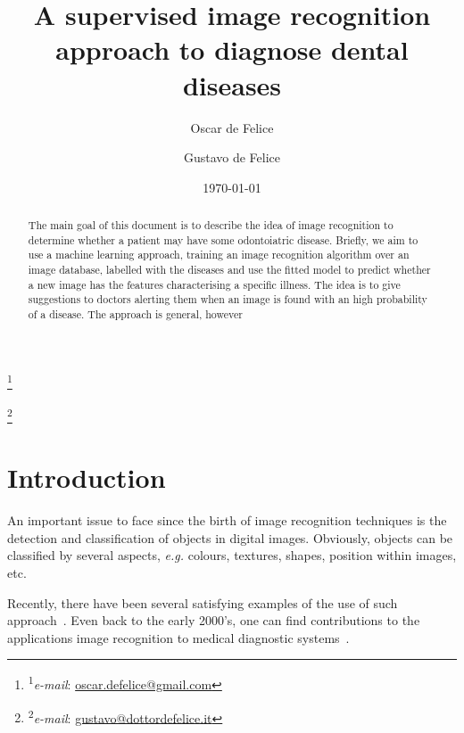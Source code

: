 \documentclass[a4paper, 10pt, superscriptaddress, nofootinbib, showkeys, notitlepage]{revtex4-1}
\begin{document}

\author{Oscar de Felice}
	{\let\thefootnote\relax\footnote{\hspace{-4ex}\textsuperscript{1}\emph{e-mail}: \href{mailto:oscar.defelice@gmail.com}{oscar.defelice@gmail.com}}}
\author{Gustavo de Felice}
	{\let\thefootnote\relax\footnote{\hspace{-4ex}\textsuperscript{2}\emph{e-mail}: \href{mailto:gustavo@dottordefelice.it}{gustavo@dottordefelice.it}}}



\date{\today}
%
%
%
\title{A supervised image recognition approach to diagnose dental diseases}
%
\begin{abstract}
%
	The main goal of this document is to describe the idea of image recognition to determine whether a patient may have some odontoiatric disease.
	Briefly, we aim to use a machine learning approach, training an image recognition algorithm over an image database, labelled with the diseases and use the fitted model to predict whether a new image has the features characterising a specific illness. The idea is to give suggestions to doctors alerting them when an image is found with an high probability of a disease.
	The approach is general, however 
%
\end{abstract}
%
\maketitle
%

\section*{Introduction}
	An important issue to face since the birth of image recognition techniques is the detection and classification of objects in digital images. 
	Obviously, objects can be classified by several aspects, \emph{e.g.} colours, textures, shapes, position within images, etc.
	
	Recently, there have been several satisfying examples of the use of such approach~\cite{stocazzo1}. 
	Even back to the early 2000's, one can find contributions to the applications image recognition to medical diagnostic systems~\cite{stocazzo2}.
	
\end{document}
